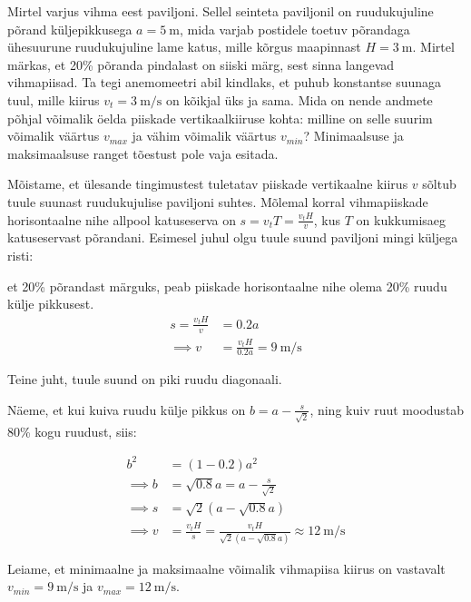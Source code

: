 
Mirtel varjus vihma eest paviljoni. Sellel seinteta paviljonil on ruudukujuline põrand küljepikkusega $a = \SI{5}{\meter}$, mida varjab postidele toetuv põrandaga ühesuurune ruudukujuline lame katus, mille kõrgus maapinnast $H=\SI{3}{\meter}$. Mirtel märkas, et 20\% põranda pindalast on siiski märg, sest sinna langevad vihmapiisad. Ta tegi anemomeetri abil kindlaks, et puhub konstantse suunaga tuul, mille kiirus $v_t = \SI{3}{\meter\per\second}$ on kõikjal üks ja sama. Mida on nende andmete põhjal võimalik öelda piiskade vertikaalkiiruse kohta: milline on selle suurim võimalik väärtus $v_{max}$ ja vähim võimalik väärtus $v_{min}$?
Minimaalsuse ja maksimaalsuse ranget tõestust pole vaja esitada.




\hint

\solu
Mõistame, et ülesande tingimustest tuletatav piiskade vertikaalne kiirus $v$ sõltub tuule suunast ruudukujulise paviljoni suhtes. Mõlemal korral vihmapiiskade horisontaalne nihe allpool katuseserva on $s = v_t T = \frac{v_t H}{v}$, kus $T$ on kukkumisaeg katuseservast põrandani. Esimesel juhul olgu tuule suund paviljoni mingi küljega risti:

\osa et 20\% põrandast märguks, peab piiskade horisontaalne nihe olema 20\% ruudu külje pikkusest.
\begin{align*}
    s = \frac{v_t H}{v} &= 0.2a \\
    \implies v &= \frac{v_t H}{0.2a} = \SI{9}{\meter\per\second}
\end{align*}

\osa Teine juht, tuule suund on piki ruudu diagonaali.


Näeme, et kui kuiva ruudu külje pikkus on $b = a-\frac{s}{\sqrt{2}}$, ning kuiv ruut moodustab 80\% kogu ruudust, siis:

\begin{align*}
    b^2 &= (1-0.2)a^2\\
    \implies b &= \sqrt{0.8} a = a - \frac{s}{\sqrt{2}}\\
    \implies s &= \sqrt{2}(a-\sqrt{0.8}a) \\ 
    \implies v &= \frac{v_t H}{s} = \frac{v_t H}{\sqrt{2}(a-\sqrt{0.8}a)} \approx \SI{12}{\meter\per\second}
\end{align*}

Leiame, et minimaalne ja maksimaalne võimalik vihmapiisa kiirus on vastavalt $v_{min} = \SI{9}{\meter\per\second}$ ja $v_{max} = \SI{12}{\meter\per\second}$.
\probend